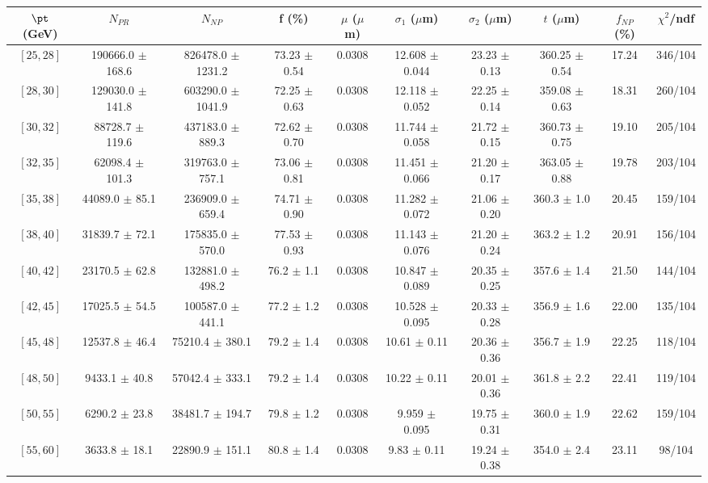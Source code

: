 \begin{tabular}{c||c|c|c|c|c|c|c||c|c}
$\pt$ (GeV) & $N_{PR}$ & $N_{NP}$ & f (\%) & $\mu$ ($\mu$m) & $\sigma_1$ ($\mu$m) & $\sigma_2$ ($\mu$m)  & $t$ ($\mu$m) & $f_{NP}$ (\%) & $\chi^2$/ndf \\
\hline
$[25, 28]$ & 190666.0 $\pm$ 168.6 & 826478.0 $\pm$ 1231.2 & 73.23 $\pm$ 0.54 & 0.0308 & 12.608 $\pm$ 0.044 & 23.23 $\pm$ 0.13 & 360.25 $\pm$ 0.54 & 17.24 & 346/104\\
$[28, 30]$ & 129030.0 $\pm$ 141.8 & 603290.0 $\pm$ 1041.9 & 72.25 $\pm$ 0.63 & 0.0308 & 12.118 $\pm$ 0.052 & 22.25 $\pm$ 0.14 & 359.08 $\pm$ 0.63 & 18.31 & 260/104\\
$[30, 32]$ & 88728.7 $\pm$ 119.6 & 437183.0 $\pm$ 889.3 & 72.62 $\pm$ 0.70 & 0.0308 & 11.744 $\pm$ 0.058 & 21.72 $\pm$ 0.15 & 360.73 $\pm$ 0.75 & 19.10 & 205/104\\
$[32, 35]$ & 62098.4 $\pm$ 101.3 & 319763.0 $\pm$ 757.1 & 73.06 $\pm$ 0.81 & 0.0308 & 11.451 $\pm$ 0.066 & 21.20 $\pm$ 0.17 & 363.05 $\pm$ 0.88 & 19.78 & 203/104\\
$[35, 38]$ & 44089.0 $\pm$ 85.1 & 236909.0 $\pm$ 659.4 & 74.71 $\pm$ 0.90 & 0.0308 & 11.282 $\pm$ 0.072 & 21.06 $\pm$ 0.20 & 360.3 $\pm$ 1.0 & 20.45 & 159/104\\
$[38, 40]$ & 31839.7 $\pm$ 72.1 & 175835.0 $\pm$ 570.0 & 77.53 $\pm$ 0.93 & 0.0308 & 11.143 $\pm$ 0.076 & 21.20 $\pm$ 0.24 & 363.2 $\pm$ 1.2 & 20.91 & 156/104\\
$[40, 42]$ & 23170.5 $\pm$ 62.8 & 132881.0 $\pm$ 498.2 & 76.2 $\pm$ 1.1 & 0.0308 & 10.847 $\pm$ 0.089 & 20.35 $\pm$ 0.25 & 357.6 $\pm$ 1.4 & 21.50 & 144/104\\
$[42, 45]$ & 17025.5 $\pm$ 54.5 & 100587.0 $\pm$ 441.1 & 77.2 $\pm$ 1.2 & 0.0308 & 10.528 $\pm$ 0.095 & 20.33 $\pm$ 0.28 & 356.9 $\pm$ 1.6 & 22.00 & 135/104\\
$[45, 48]$ & 12537.8 $\pm$ 46.4 & 75210.4 $\pm$ 380.1 & 79.2 $\pm$ 1.4 & 0.0308 & 10.61 $\pm$ 0.11 & 20.36 $\pm$ 0.36 & 356.7 $\pm$ 1.9 & 22.25 & 118/104\\
$[48, 50]$ & 9433.1 $\pm$ 40.8 & 57042.4 $\pm$ 333.1 & 79.2 $\pm$ 1.4 & 0.0308 & 10.22 $\pm$ 0.11 & 20.01 $\pm$ 0.36 & 361.8 $\pm$ 2.2 & 22.41 & 119/104\\
$[50, 55]$ & 6290.2 $\pm$ 23.8 & 38481.7 $\pm$ 194.7 & 79.8 $\pm$ 1.2 & 0.0308 & 9.959 $\pm$ 0.095 & 19.75 $\pm$ 0.31 & 360.0 $\pm$ 1.9 & 22.62 & 159/104\\
$[55, 60]$ & 3633.8 $\pm$ 18.1 & 22890.9 $\pm$ 151.1 & 80.8 $\pm$ 1.4 & 0.0308 & 9.83 $\pm$ 0.11 & 19.24 $\pm$ 0.38 & 354.0 $\pm$ 2.4 & 23.11 & 98/104\\

\end{tabular}
